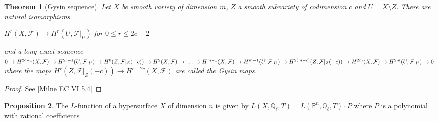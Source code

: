 \documentclass{ucbthesis}
\newtheorem{thm}{Theorem}[section]
\theoremstyle{definition}
\theoremstyle{theorem}
\newtheorem{prop}[thm]{Proposition}
\begin{document}
\begin{thm}[Gysin sequence]
Let $X$ be smooth variety of dimension $m$, $Z$ a smooth subvariety of codimension $c$ and $U = X\setminus Z$. There are natural isomorphisms \begin{center}$H^{r}(X,\mathcal{F}) \rightarrow H^{r}(U,\mathcal{F}|_{U})$ for $ 0\leq r \leq 2c-2$ \end{center} and a long exact sequence \vspace{3mm}\\ $0\rightarrow H^{2c-1}(X,\mathcal{F}) \rightarrow H^{2c-1}(U,\mathcal{F}|_{U}) \rightarrow H^{0}(Z,\mathcal{F}|_{Z}(-c)) \rightarrow H^{2}(X,\mathcal{F}) \rightarrow \ldots \vspace{2mm} \rightarrow H^{m-1}(X,\mathcal{F}) \rightarrow H^{m-1}(U,\mathcal{F}|_{U})\rightarrow H^{2(m-c)}(Z,\mathcal{F}|_{Z}(-c)) \rightarrow H^{2m}(X,\mathcal{F})\rightarrow H^{2m}(U,\mathcal{F}|_{U}) \rightarrow 0 $\vspace{3mm}\\ 
where the maps $H^{r}(Z,\mathcal{F}|_{Z}(-c)) \rightarrow H^{r+2c}(X,\mathcal{F})$ are called the Gysin maps. 
\end{thm}
\begin{proof}
See [Milne EC VI 5.4]
\end{proof}

\begin{prop}
The $L$-function of a hypersurface $X$  of dimension $n$ is given by $L(X,\mathbb{Q}_{\ell},T) = L(\mathbb{P}^{n},\mathbb{Q}_{\ell},T)\cdot P$ where $P$ is a polynomial with rational coefficients
\end{prop}
\end{document}
